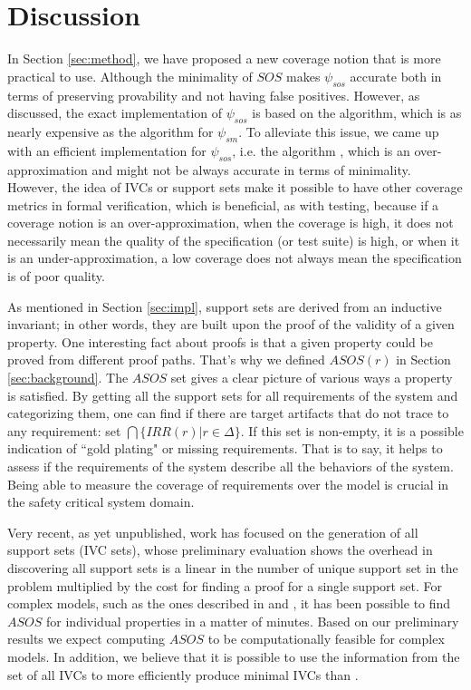 \section{Discussion}
\label{sec:discussion}

In Section \ref{sec:method}, we have proposed a new coverage notion that
is more practical to use. Although the minimality of $SOS$ makes $\psi_{sos}$ accurate
 both in terms of preserving provability and not having false positives. However, as discussed, the exact implementation of $\psi_{sos}$ is based on the \ucbfalg algorithm, which is as nearly expensive as the \mustalg algorithm for $\psi_{sm}$. 
 To alleviate this issue, we came up with an efficient implementation for $\psi_{sos}$, i.e. the \ucalg algorithm \cite{Ghass16}, 
 which is an over-approximation and might not be always accurate in terms of minimality. 
 However, the idea of IVCs or support sets make
it possible to have other coverage metrics in formal verification, which is beneficial, as with testing, because if a
coverage notion is an over-approximation, when the coverage
 is high, it does not necessarily mean the quality of
 the specification (or test suite) is high, or when it is an under-approximation, a low coverage does not always mean the specification is of poor quality.

 As mentioned in Section \ref{sec:impl}, support sets are derived from an inductive invariant; in other words, they are built upon the proof of the validity of a given property. One interesting fact about proofs
  is that a given property could be proved from different proof paths. That's why we defined $ASOS(r)$ in Section \ref{sec:background}. The $ASOS$ set gives a clear picture of various ways a property is satisfied. By getting all the support sets for all requirements of the system and categorizing them, one can find if there are target artifacts that do not trace to any requirement: set $\bigcap \{IRR (r) | r \in \Delta \}$.  If this set is non-empty, it is a possible indication of ``gold plating" or missing requirements. That is to say, it helps to assess if the requirements of the system describe all the behaviors of the system. Being able to measure the coverage of requirements over the model is crucial in the safety critical system domain.

Very recent, as yet unpublished, work has focused on the
generation of all support sets (IVC sets), whose preliminary evaluation
shows the overhead in discovering all support sets is a linear in the
number of unique support set in the problem multiplied by the cost
for finding a proof for a single support set. For complex models, such
as the ones described in \cite {QFCS15:backes} and \cite{hilt2013}, it has been possible to
find $ASOS$ for individual properties in a matter of minutes.
Based on our preliminary results we expect computing $ASOS$ to be computationally feasible for complex models. In
addition, we believe that it is possible to use the information
from the set of all IVCs to more efficiently produce minimal
IVCs than \ucbfalg.

